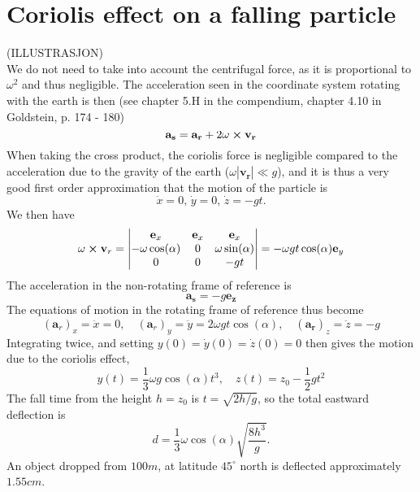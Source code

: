 \documentclass{article}
\begin{document}
    \section{Coriolis effect on a falling particle}
    (ILLUSTRASJON)\\
    We do not need to take into account the centrifugal force, as it is proportional to $\omega^2$ and thus negligible. The acceleration seen in the coordinate system rotating with the earth is then (see chapter 5.H in the compendium, chapter 4.10 in Goldstein, p. 174 - 180)
    \begin{equation*}
        \mathbf{a_s} = \mathbf{a_r} + 2 \mathbf{\omega} \cross \mathbf{v_r}
    \end{equation*}
    When taking the cross product, the coriolis force is negligible compared to the acceleration due to the gravity of the earth ($\omega |\mathbf{v_r}| \ll g $), and it is thus a very good first order approximation that the motion of the particle is
    \begin{equation*}
        \dot x = 0, \, \dot y = 0, \, \dot z = -gt.
    \end{equation*}
    We then have
    \begin{equation*}
        \omega \cross \mathbf{v}_r= 
        \begin{vmatrix}
            \mathbf{e}_x & \mathbf{e}_x & \mathbf{e}_x \\
            -\omega \cos(\alpha) & 0 & \omega \sin(\alpha) \\
            0 & 0 & -g t
        \end{vmatrix}
        = -\omega g t \cos(\alpha) \mathbf{e}_y
    \end{equation*}
    The acceleration in the non-rotating frame of reference is
    \begin{equation*}
        \mathbf{a_s} = -g \mathbf{e_z}
    \end{equation*}
    The equations of motion in the rotating frame of reference thus become
    \begin{equation*}
        (\mathbf{a}_r)_x = \ddot x = 0, \quad (\mathbf{a}_r)_y = \ddot y = 2 \omega g t \cos(\alpha), \quad (\mathbf{a_r})_z = \ddot z = -g  
    \end{equation*}
    Integrating twice, and setting $y(0) = \dot y(0) = \dot z(0) = 0$ then gives the motion due to the coriolis effect,
    \begin{equation*}
        y(t) = \frac{1}{3}\omega g \cos(\alpha) t^3, \quad z(t) = z_0 - \frac{1}{2}g t^2
    \end{equation*}
    The fall time from the height $h = z_0$ is $t = \sqrt{2h / g}$, so the total eastward deflection is
    \begin{equation*}
        d = \frac{1}{3} \omega \cos(\alpha)\sqrt{\frac{8 h^3}{g}}.
    \end{equation*}
    An object dropped from $100 \si{m}$, at latitude $45^\circ $ north is deflected approximately $1.55 \si{cm}$. 
\end{document}
